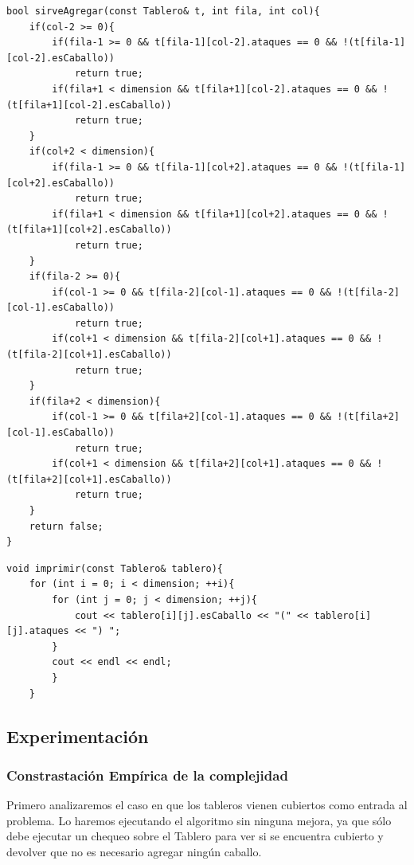 \newpage

	\begin{codesnippet}
	\begin{verbatim}
bool sirveAgregar(const Tablero& t, int fila, int col){
    if(col-2 >= 0){
        if(fila-1 >= 0 && t[fila-1][col-2].ataques == 0 && !(t[fila-1][col-2].esCaballo))
            return true;
        if(fila+1 < dimension && t[fila+1][col-2].ataques == 0 && !(t[fila+1][col-2].esCaballo))
            return true;
    }
    if(col+2 < dimension){
        if(fila-1 >= 0 && t[fila-1][col+2].ataques == 0 && !(t[fila-1][col+2].esCaballo))
            return true;
        if(fila+1 < dimension && t[fila+1][col+2].ataques == 0 && !(t[fila+1][col+2].esCaballo)) 
            return true;
    }
    if(fila-2 >= 0){
        if(col-1 >= 0 && t[fila-2][col-1].ataques == 0 && !(t[fila-2][col-1].esCaballo)) 
            return true;
        if(col+1 < dimension && t[fila-2][col+1].ataques == 0 && !(t[fila-2][col+1].esCaballo))
            return true;
    }
    if(fila+2 < dimension){
        if(col-1 >= 0 && t[fila+2][col-1].ataques == 0 && !(t[fila+2][col-1].esCaballo)) 
            return true;
        if(col+1 < dimension && t[fila+2][col+1].ataques == 0 && !(t[fila+2][col+1].esCaballo)) 
            return true;
    }
    return false;
}
	\end{verbatim}
	\end{codesnippet}
	
		\begin{codesnippet}
	\begin{verbatim}
void imprimir(const Tablero& tablero){
    for (int i = 0; i < dimension; ++i){
        for (int j = 0; j < dimension; ++j){
            cout << tablero[i][j].esCaballo << "(" << tablero[i][j].ataques << ") ";
        }
        cout << endl << endl;    
        }
    }
	\end{verbatim}
	\end{codesnippet}

\newpage
\subsection{Experimentaci\'on}

\subsubsection{Constrastaci\'on Emp\'irica de la complejidad}\label{tiempos}

Primero analizaremos el caso en que los tableros vienen cubiertos como entrada al problema. Lo haremos ejecutando el algoritmo sin ninguna mejora, ya que s\'olo debe ejecutar un chequeo sobre el Tablero para ver si se encuentra cubierto y devolver que no es necesario agregar ning\'un caballo.

